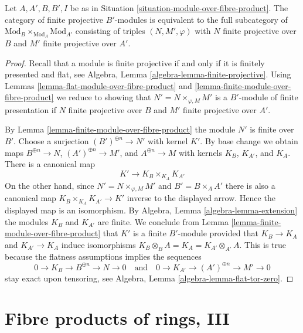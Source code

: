 \begin{lemma}
\label{lemma-finitely-presented-module-over-fibre-product}
Let $A, A', B, B', I$ be as in
Situation \ref{situation-module-over-fibre-product}.
The category of finite projective $B'$-modules
is equivalent to the full subcategory
of $\text{Mod}_B \times_{\text{Mod}_A} \text{Mod}_{A'}$
consisting of triples $(N, M', \varphi)$
with $N$ finite projective over $B$ and $M'$ finite projective over $A'$.
\end{lemma}

\begin{proof}
Recall that a module is finite projective if and only if
it is finitely presented and flat, see
Algebra, Lemma \ref{algebra-lemma-finite-projective}.
Using Lemmas \ref{lemma-flat-module-over-fibre-product} and
\ref{lemma-finite-module-over-fibre-product}
we reduce to showing that $N' = N \times_{\varphi, M} M'$ is
a $B'$-module of finite presentation if
$N$ finite projective over $B$
and $M'$ finite projective over $A'$.

\medskip\noindent
By Lemma \ref{lemma-finite-module-over-fibre-product}
the module $N'$ is finite over $B'$. Choose a surjection
$(B')^{\oplus n} \to N'$ with kernel $K'$. By base change we obtain maps
$B^{\oplus n} \to N$, $(A')^{\oplus n} \to M'$, and $A^{\oplus n} \to M$
with kernels $K_B$, $K_{A'}$, and $K_A$. There is a canonical map
$$
K' \longrightarrow K_B \times_{K_A} K_{A'}
$$
On the other hand, since $N' = N \times_{\varphi, M} M'$ and
$B' = B \times_A A'$ there is also a
canonical map $K_B \times_{K_A} K_{A'} \to K'$ inverse to the displayed
arrow. Hence the displayed map is an isomorphism. By
Algebra, Lemma \ref{algebra-lemma-extension}
the modules $K_B$ and $K_{A'}$ are finite. We conclude from
Lemma \ref{lemma-finite-module-over-fibre-product}
that $K'$ is a finite $B'$-module provided that $K_B \to K_A$ and
$K_{A'} \to K_A$ induce isomorphisms
$K_B \otimes_B A = K_A = K_{A'} \otimes_{A'} A$.
This is true because the flatness assumptions implies the sequences
$$
0 \to K_B \to B^{\oplus n} \to N \to 0
\quad\text{and}\quad
0 \to K_{A'} \to (A')^{\oplus n} \to M' \to 0
$$
stay exact upon tensoring, see
Algebra, Lemma \ref{algebra-lemma-flat-tor-zero}.
\end{proof}





\section{Fibre products of rings, III}
\label{section-fibre-products-rings-III}

